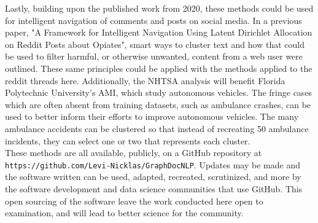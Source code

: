 Lastly, building upon the published work from 2020, these methods could be used for intelligent navigation of comments and posts on social media. In a previous paper, "A Framework for Intelligent Navigation Using Latent Dirichlet Allocation on Reddit Posts about Opiates", smart ways to cluster text and how that could be used to filter harmful, or otherwise unwanted, content from a web user were outlined. These same principles could be applied with the methods applied to the reddit threads here. Additionally, the NHTSA analysis will benefit Florida Polytechnic University's AMI, which study autonomous vehicles. The fringe cases which are often absent from training datasets, such as ambulance crashes, can be used to better inform their efforts to improve autonomous vehicles. The many ambulance accidents can be clustered so that instead of recreating 50 ambulance incidents, they can select one or two that represents each cluster. \\
These methods are all available, publicly, on a GitHub repository at \texttt{https://github.com/Levi-Nicklas/GraphDocNLP}. Updates may be made and the software written can be used, adapted, recreated, scrutinized, and more by the software development and data science communities that use GitHub. This open sourcing of the software leave the work conducted here open to examination, and will lead to better science for the community.